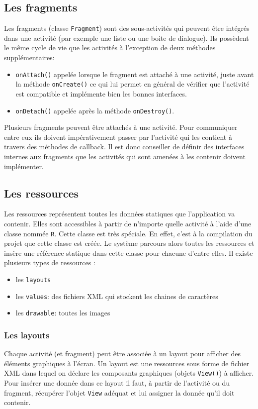 \subsection{Les fragments}
Les fragments (classe \verb!Fragment!) sont des sous-activités qui peuvent être intégrés dans une activité (par exemple une liste ou une boite de dialogue). Ils possèdent le même cycle de vie que les activités à l'exception de deux méthodes supplémentaires:\bigskip
 
\begin{itemize}
 	\item \verb!onAttach()! appelée lorsque le fragment est attaché à une activité, juste avant la méthode \verb!onCreate()! ce qui lui permet en général de vérifier que l'activité est compatible et implémente bien les bonnes interfaces.
 	\item \verb!onDetach()! appelée après la méthode \verb!onDestroy()!.
\end{itemize}\bigskip

Plusieurs fragments peuvent être attachés à une activité. Pour communiquer entre eux ils doivent impérativement passer par l'activité qui les contient à travers des méthodes de callback. Il est donc conseiller de définir des interfaces internes aux fragments que les activités qui sont amenées à les contenir doivent implémenter. 

\subsection{Les ressources}
Les ressources représentent toutes les données statiques que l'application va contenir. Elles sont accessibles à partir de n'importe quelle activité à l'aide d'une classe nommée \verb!R!. Cette classe est très spéciale. En effet, c'est à la compilation du projet que cette classe est créée. Le système parcours alors toutes les ressources et insère une référence statique dans cette classe pour chacune d'entre elles.\bigskip
Il existe plusieurs types de ressources :\bigskip

\begin{itemize}
 	\item les \verb!layouts!
 	\item les \verb!values!: des fichiers XML qui stockent les chaines de caractères
 	\item les \verb!drawable!: toutes les images
\end{itemize}\bigskip

\subsubsection{Les layouts}
Chaque activité (et fragment) peut être associée à un layout pour afficher des éléments graphiques à l'écran. Un layout est une ressources sous forme de fichier XML dans lequel on déclare les composants graphiques (objets \verb!View()!) à afficher. Pour insérer une donnée dans ce layout il faut, à partir de l'activité ou du fragment, récupérer l'objet \verb!View! adéquat et lui assigner la donnée qu'il doit contenir. \bigskip

